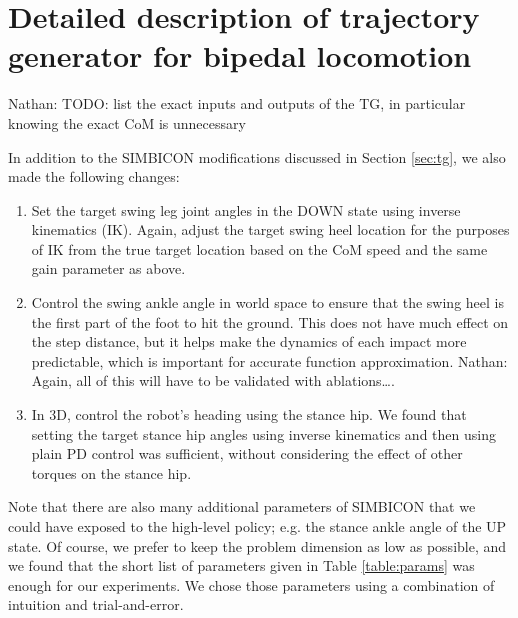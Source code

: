 \documentclass[conference]{IEEEtran}
\newcommand{\nhatch}[1]{{\leavevmode\color{magenta} Nathan: #1}}
\begin{document}




\appendix

\section{Detailed description of trajectory generator for bipedal locomotion}

\label{app:simbicon}

\nhatch{TODO: list the exact inputs and outputs of the TG, in particular knowing the exact CoM is unnecessary}

In addition to the SIMBICON modifications discussed in Section \ref{sec:tg}, we also made the following changes:

\begin{enumerate}
  \item Set the target swing leg joint angles in the DOWN state using inverse kinematics (IK).
    Again, adjust the target swing heel location for the purposes of IK from the true target location based on the CoM speed and the same gain parameter as above.

  \item Control the swing ankle angle in world space to ensure that the swing heel is the first part of the foot to hit the ground.
    This does not have much effect on the step distance, but it helps make the dynamics of each impact more predictable, which is important for accurate function approximation.
    \nhatch{Again, all of this will have to be validated with ablations\dots.}

  \item In 3D, control the robot's heading using the stance hip.
    We found that setting the target stance hip angles using inverse kinematics and then using plain PD control was sufficient, without considering the effect of other torques on the stance hip.
\end{enumerate}

Note that there are also many additional parameters of SIMBICON that we could have exposed to the high-level policy; e.g. the stance ankle angle of the UP state.
Of course, we prefer to keep the problem dimension as low as possible, and we found that the short list of parameters given in Table \ref{table:params} was enough for our experiments.
We chose those parameters using a combination of intuition and trial-and-error.
\end{document}
